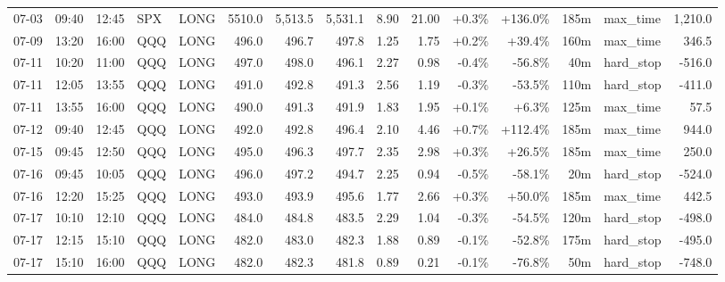 \documentclass[11pt,a4paper,twoside]{article}
\begin{document}
\begin{landscape}
\begin{center}
\begin{longtable}{>{\color{txtmain}}l l l l l r r r r r r r r >{\color{txtmain}}l r}
07-03 & 09:40 & 12:45 & SPX & LONG & 5510.0 & 5,513.5 & 5,531.1 & 8.90 & 21.00 & \textcolor{wingreen}{+0.3\%} & \textcolor{wingreen}{+136.0\%} & 185m & max\_time & \textcolor{wingreen}{1,210.0} \\
07-09 & 13:20 & 16:00 & QQQ & LONG & 496.0 & 496.7 & 497.8 & 1.25 & 1.75 & \textcolor{wingreen}{+0.2\%} & \textcolor{wingreen}{+39.4\%} & 160m & max\_time & \textcolor{wingreen}{346.5} \\
07-11 & 10:20 & 11:00 & QQQ & LONG & 497.0 & 498.0 & 496.1 & 2.27 & 0.98 & \textcolor{lossred}{-0.4\%} & \textcolor{lossred}{-56.8\%} & 40m & hard\_stop & \textcolor{lossred}{-516.0} \\
07-11 & 12:05 & 13:55 & QQQ & LONG & 491.0 & 492.8 & 491.3 & 2.56 & 1.19 & \textcolor{lossred}{-0.3\%} & \textcolor{lossred}{-53.5\%} & 110m & hard\_stop & \textcolor{lossred}{-411.0} \\
07-11 & 13:55 & 16:00 & QQQ & LONG & 490.0 & 491.3 & 491.9 & 1.83 & 1.95 & \textcolor{wingreen}{+0.1\%} & \textcolor{wingreen}{+6.3\%} & 125m & max\_time & \textcolor{wingreen}{57.5} \\
07-12 & 09:40 & 12:45 & QQQ & LONG & 492.0 & 492.8 & 496.4 & 2.10 & 4.46 & \textcolor{wingreen}{+0.7\%} & \textcolor{wingreen}{+112.4\%} & 185m & max\_time & \textcolor{wingreen}{944.0} \\
07-15 & 09:45 & 12:50 & QQQ & LONG & 495.0 & 496.3 & 497.7 & 2.35 & 2.98 & \textcolor{wingreen}{+0.3\%} & \textcolor{wingreen}{+26.5\%} & 185m & max\_time & \textcolor{wingreen}{250.0} \\
07-16 & 09:45 & 10:05 & QQQ & LONG & 496.0 & 497.2 & 494.7 & 2.25 & 0.94 & \textcolor{lossred}{-0.5\%} & \textcolor{lossred}{-58.1\%} & 20m & hard\_stop & \textcolor{lossred}{-524.0} \\
07-16 & 12:20 & 15:25 & QQQ & LONG & 493.0 & 493.9 & 495.6 & 1.77 & 2.66 & \textcolor{wingreen}{+0.3\%} & \textcolor{wingreen}{+50.0\%} & 185m & max\_time & \textcolor{wingreen}{442.5} \\
07-17 & 10:10 & 12:10 & QQQ & LONG & 484.0 & 484.8 & 483.5 & 2.29 & 1.04 & \textcolor{lossred}{-0.3\%} & \textcolor{lossred}{-54.5\%} & 120m & hard\_stop & \textcolor{lossred}{-498.0} \\
07-17 & 12:15 & 15:10 & QQQ & LONG & 482.0 & 483.0 & 482.3 & 1.88 & 0.89 & \textcolor{lossred}{-0.1\%} & \textcolor{lossred}{-52.8\%} & 175m & hard\_stop & \textcolor{lossred}{-495.0} \\
07-17 & 15:10 & 16:00 & QQQ & LONG & 482.0 & 482.3 & 481.8 & 0.89 & 0.21 & \textcolor{lossred}{-0.1\%} & \textcolor{lossred}{-76.8\%} & 50m & hard\_stop & \textcolor{lossred}{-748.0} \\

\end{longtable}
\end{center}
\end{landscape}
\end{document}
